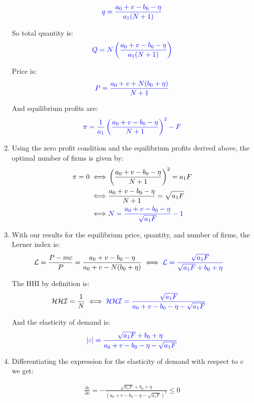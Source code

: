 \documentclass[11pt,english]{article}
\begin{document}
\begin{enumerate}
\[
\textcolor{blue}{q=\frac{a_{0}+v-b_{0}-\eta}{a_{1}(N+1)}}
\]

So total quantity is:
\[
\textcolor{blue}{Q=N\left(\frac{a_{0}+v-b_{0}-\eta}{a_{1}(N+1)}\right)}
\]

Price is:
\[
\textcolor{blue}{P=\frac{a_{0}+v+N(b_{0}+\eta)}{N+1}}
\]

And equilibrium profits are:
\[
\textcolor{blue}{\pi=\frac{1}{a_{1}}\left(\frac{a_{0}+v-b_{0}-\eta}{N+1}\right)^{2}-F}
\]

\item Using the zero profit condition and the equilibrium profits derived above, the optimal number of firms is given by:
\begin{align}
\pi=0\iff &\left(\frac{a_{0}+v-b_{0}-\eta}{N+1}\right)^{2}=a_{1}F\nonumber\\
\iff &\frac{a_{0}+v-b_{0}-\eta}{N+1}=\sqrt{a_{1}F}\nonumber\\
\iff&\textcolor{blue}{N=\frac{a_{0}+v-b_{0}-\eta}{\sqrt{a_{1}F}}-1}\nonumber
\end{align}

\item With our results for the equilibrium price, quantity, and number of firms, the Lerner index is:
\begin{align}
\mathcal{L}&=\frac{P-mc}{P}=\frac{a_{0}+v-b_{0}-\eta}{a_{0}+v-N(b_{0}+\eta)}\iff \textcolor{blue}{\mathcal{L}=\frac{\sqrt{a_{1}F}}{\sqrt{a_{1}F}+b_{0}+\eta}}\nonumber
\end{align}

The HHI by definition is:
\begin{align}
\mathcal{HHI}&=\frac{1}{N}\iff\textcolor{blue}{\mathcal{HHI}=\frac{\sqrt{a_{1}F}}{a_{0}+v-b_{0}-\eta-\sqrt{a_{1}F}}}\nonumber
\end{align}

And the elasticity of demand is:
\begin{align}
\textcolor{blue}{|\varepsilon|=\frac{\sqrt{a_{1}F}+b_{0}+\eta}{a_{0}+v-b_{0}-\eta-\sqrt{a_{1}F}}}\nonumber
\end{align}

\item Differentiating the expression for the elasticity of demand with respect to $v$ we get:

\begin{align}
\frac{\partial \varepsilon}{\partial v}=-\frac{\sqrt{a_{1}F}+b_{0}+\eta}{(a_{0}+v-b_{0}-\eta-\sqrt{a_{1}F})^{2}}\leq0\nonumber
\end{align}


\end{enumerate}
\end{document}
